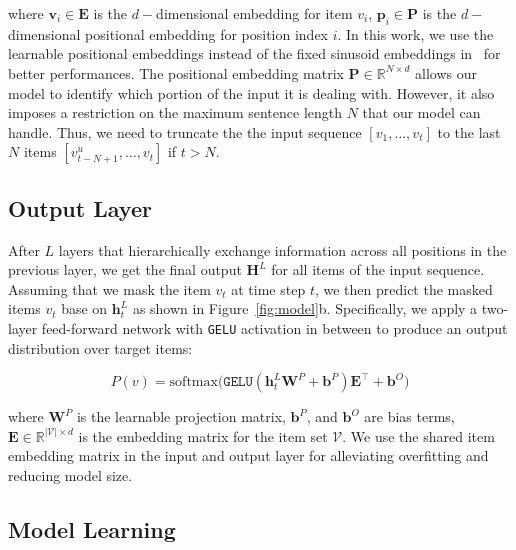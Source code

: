 where $\bm{v}_i {\in} \bm{E}$ is the $d-$dimensional embedding for item $v_i$, $\bm{p}_i {\in} \bm{P}$ is the $d-$dimensional positional embedding for position index $i$. In this work, we use the learnable positional embeddings instead of the fixed sinusoid embeddings in~\cite{Vaswani:nips2017:Attention} for better performances. The positional embedding matrix $\bm{P} \in \mathbb{R}^{N\times d}$ allows our model to identify which portion of the input it is dealing with. However, it also imposes a restriction on the maximum sentence length $N$ that our model can handle. Thus, we need to truncate the the input sequence $[v_1,\dots,v_t]$ to the last $N$ items $[v_{t-N+1}^{u},\dots,v_t]$ if $t>N$.

\subsection{Output Layer}

After $L$ layers that hierarchically exchange information across all positions in the previous layer, we get the final output $\bm{H}^L$ for all items of the input sequence. Assuming that we mask the item $v_t$ at time step $t$, we then predict the masked items $v_t$ base on $\bm{h}_t^L$ as shown in Figure~\ref{fig:model}b.
Specifically, we apply a two-layer feed-forward network with \texttt{GELU} activation in between to produce an output distribution over target items:

\begin{equation}
    P(v) = \mathrm{softmax}\bigl(\mathtt{GELU}(\bm{h}_t^L \bm{W}^P +\bm{b}^P) \bm{E}^{\top} + \bm{b}^O \bigr)
    \label{eq:prob}
\end{equation}

where $\bm{W}^P$ is the learnable projection matrix, $\bm{b}^P$, and $\bm{b}^O$ are bias terms, $\bm{E}\in \mathbb{R}^{|\mathcal{V}|\times d}$ is the embedding matrix for the item set $\mathcal{V}$.
We use the shared item embedding matrix in the input and output layer for alleviating overfitting and reducing model size.

\subsection{Model Learning}
\label{sec:ml}


